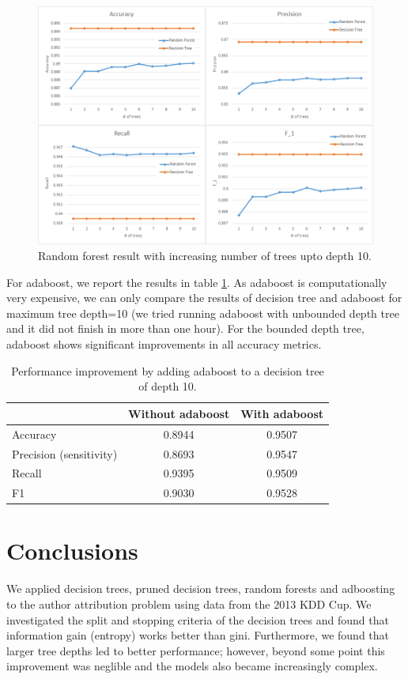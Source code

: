 \documentclass[letterpaper,12pt]{article}
\begin{document}
\begin{figure}[ht!]
\includegraphics[width=\textwidth]{images/RF_Bounded.png}
\caption{Random forest result with increasing number of trees upto depth 10.}\label{fig:randomforestbounded}
\end{figure}

For adaboost, we report the results in table \ref{table:adaboost}. As adaboost is computationally very expensive, we can only compare the results of decision tree and adaboost for maximum tree depth=10 (we tried running adaboost with unbounded depth tree and it did not finish in more than one hour). For the bounded depth tree, adaboost shows significant improvements in all accuracy metrics. 

\begin{table}[ht!]
\centering
\caption{Performance improvement by adding adaboost to a decision tree of depth 10. }\label{table:adaboost}

\begin{tabular}{|l|c|c|}
\hline
& Without adaboost & With adaboost\\\hline
Accuracy & 0.8944 & 0.9507\\\hline
Precision (sensitivity) & 0.8693 &  0.9547\\\hline
Recall & 0.9395 & 0.9509\\\hline
F1 & 0.9030 & 0.9528\\\hline
\end{tabular}
\end{table}
\section{Conclusions}
We applied decision trees, pruned decision trees, random forests and adboosting to the author attribution problem using data from the 2013 KDD Cup. We investigated the split and stopping criteria of the decision trees and found that information gain (entropy) works better than gini. Furthermore, we found that larger tree depths led to better performance; however, beyond some point this improvement was neglible and the models also became increasingly complex.
\end{document}
